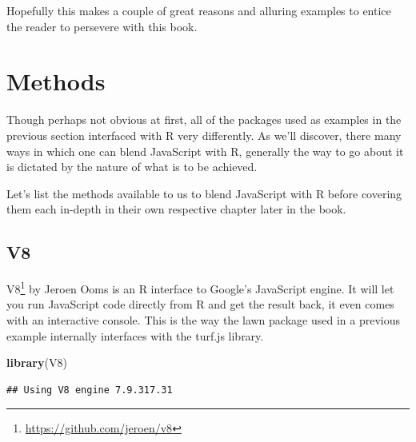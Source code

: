 \documentclass[
]{krantz}
\makeatletter
\newenvironment{Shaded}{\begin{snugshade}}{\end{snugshade}}
\newcommand{\CommentTok}[1]{\textcolor[rgb]{0.37,0.37,0.37}{\textit{#1}}}
\newcommand{\KeywordTok}[1]{\textcolor[rgb]{0.27,0.27,0.27}{\textbf{#1}}}
\newcommand{\NormalTok}[1]{#1}
\newcommand{\OperatorTok}[1]{\textcolor[rgb]{0.43,0.43,0.43}{\textbf{#1}}}
\newcommand{\StringTok}[1]{\textcolor[rgb]{0.5,0.5,0.5}{#1}}
\renewcommand{\href}[2]{#2\footnote{\url{#1}}}
\newenvironment{kframe}{%
\medskip{}
\setlength{\fboxsep}{.8em}
 \def\at@end@of@kframe{}%
 \ifinner\ifhmode%
  \def\at@end@of@kframe{\end{minipage}}%
  \begin{minipage}{\columnwidth}%
 \fi\fi%
 \def\FrameCommand##1{\hskip\@totalleftmargin \hskip-\fboxsep
 \colorbox{shadecolor}{##1}\hskip-\fboxsep
     \hskip-\linewidth \hskip-\@totalleftmargin \hskip\columnwidth}%
 \MakeFramed {\advance\hsize-\width
   \@totalleftmargin\z@ \linewidth\hsize
   \@setminipage}}%
 {\par\unskip\endMakeFramed%
 \at@end@of@kframe}
\renewenvironment{Shaded}{\begin{kframe}}{\end{kframe}}
\makeatother
\begin{document}
Hopefully this makes a couple of great reasons and alluring examples to entice the reader to persevere with this book.

\hypertarget{intro-methods}{%
\section{Methods}\label{intro-methods}}

Though perhaps not obvious at first, all of the packages used as examples in the previous section interfaced with R very differently. As we'll discover, there many ways in which one can blend JavaScript with R, generally the way to go about it is dictated by the nature of what is to be achieved.

Let's list the methods available to us to blend JavaScript with R before covering them each in-depth in their own respective chapter later in the book.

\hypertarget{intro-v8}{%
\subsection{V8}\label{intro-v8}}

\href{https://github.com/jeroen/v8}{V8} by Jeroen Ooms is an R interface to Google's JavaScript engine. It will let you run JavaScript code directly from R and get the result back, it even comes with an interactive console. This is the way the lawn package used in a previous example internally interfaces with the turf.js library.

\begin{Shaded}
\begin{Highlighting}[]
\KeywordTok{library}\NormalTok{(V8)}
\end{Highlighting}
\end{Shaded}

\begin{verbatim}
## Using V8 engine 7.9.317.31
\end{verbatim}

\begin{Shaded}
\end{Shaded}
\end{document}
